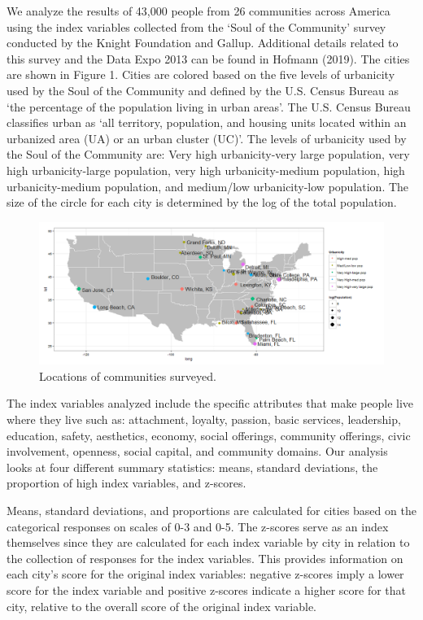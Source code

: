 \documentclass[11pt]{asaproc}
\begin{document}
We analyze the results of 43,000 people from 26 communities across
America using the index variables collected from the `Soul of the
Community' survey conducted by the Knight Foundation and Gallup.  Additional details related to this survey and the Data Expo 2013 can be found in Hofmann (2019). The
cities are shown in Figure 1. Cities are colored based on
the five levels of urbanicity used by the Soul of the Community and
defined by the U.S. Census Bureau as `the percentage of the population
living in urban areas'. The U.S. Census Bureau classifies urban as
`all territory, population, and housing units located within an
urbanized area (UA) or an urban cluster (UC)'. The levels of urbanicity
used by the Soul of the Community are: Very high urbanicity-very large
population, very high urbanicity-large population, very high
urbanicity-medium population, high urbanicity-medium population, and
medium/low urbanicity-low population. The size of the circle for each
city is determined by the log of the total population.

\pagebreak

\begin{figure}[h]
\begin{center}
\includegraphics[width=150mm]{map_new.png}
\caption{Locations of communities surveyed.}
\label{fig:map}
\end{center}
\end{figure}


The index variables analyzed include the specific attributes that make people
live where they live such as: attachment, loyalty, passion, basic services,
leadership, education, safety, aesthetics, economy, social offerings,
community offerings, civic involvement, openness, social capital, and
community domains. Our analysis looks at four different summary
statistics: means, standard deviations, the proportion of high index
variables, and z-scores.  


Means, standard deviations, and proportions are calculated for cities
based on the categorical responses on scales of 0-3 and 0-5. The
z-scores serve as an index themselves since they are calculated for
each index variable by city in relation to the collection of responses
for the index variables. This provides information on each
city's score for the original index variables: negative z-scores imply
a lower score for the index variable and positive z-scores indicate a
higher score for that city, relative to the overall score of the
original index variable. 
\end{document}

